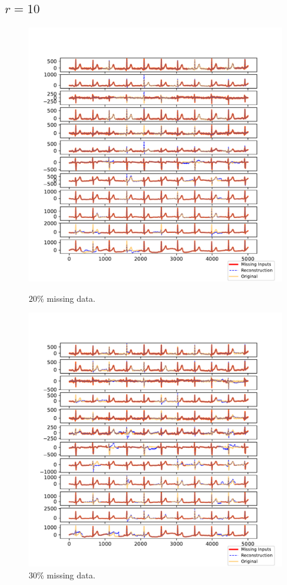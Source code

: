 \documentclass{mldsmsc}
\begin{document}
\subsection{$r = 10$}

\begin{figure}[H]
\centering
\begin{minipage}{0.4\linewidth}
    \centering
    \includegraphics[width=\linewidth]{images/missing/psmf_output_20_10.pdf}
    \caption{$20\%$ missing data.}
\end{minipage}%
\hspace{0.05\linewidth}
\begin{minipage}{0.4\linewidth}
    \centering
    \includegraphics[width=\linewidth]{images/missing/psmf_output_30_10.pdf}
    \caption{$30\%$ missing data.}
\end{minipage}


\end{figure}
\end{document}

